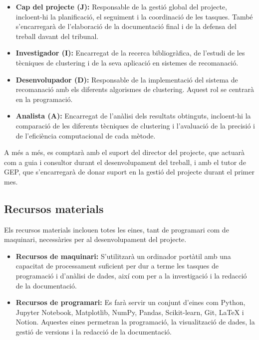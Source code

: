 \documentclass[a4paper,12pt]{report}
\begin{document}
\begin{itemize}
    \item \textbf{Cap del projecte (J):} Responsable de la gestió global del projecte, incloent-hi la planificació, el seguiment i la coordinació de les tasques. També s'encarregarà de l'elaboració de la documentació final i de la defensa del treball davant del tribunal.
    \item \textbf{Investigador (I):} Encarregat de la recerca bibliogràfica, de l'estudi de les tècniques de clustering i de la seva aplicació en sistemes de recomanació.
    \item \textbf{Desenvolupador (D):} Responsable de la implementació del sistema de recomanació amb els diferents algorismes de clustering. Aquest rol se centrarà en la programació.
    \item \textbf{Analista (A):} Encarregat de l'anàlisi dels resultats obtinguts, incloent-hi la comparació de les diferents tècniques de clustering i l'avaluació de la precisió i de l'eficiència computacional de cada mètode.
\end{itemize}

A més a més, es comptarà amb el suport del director del projecte, que actuarà com a guia i consultor durant el desenvolupament del treball, i amb el tutor de GEP, que s'encarregarà de donar suport en la gestió del projecte durant el primer mes.

\subsection{Recursos materials}

Els recursos materials inclouen totes les eines, tant de programari com de maquinari, necessàries per al desenvolupament del projecte.

\begin{itemize}
    \item \textbf{Recursos de maquinari:} S'utilitzarà un ordinador portàtil amb una capacitat de processament suficient per dur a terme les tasques de programació i d'anàlisi de dades, així com per a la investigació i la redacció de la documentació.
    \item \textbf{Recursos de programari:} Es farà servir un conjunt d'eines com Python, Jupyter Notebook, Matplotlib, NumPy, Pandas, Scikit-learn, Git, LaTeX i Notion. Aquestes eines permetran la programació, la visualització de dades, la gestió de versions i la redacció de la documentació.
\end{itemize}
\end{document}

